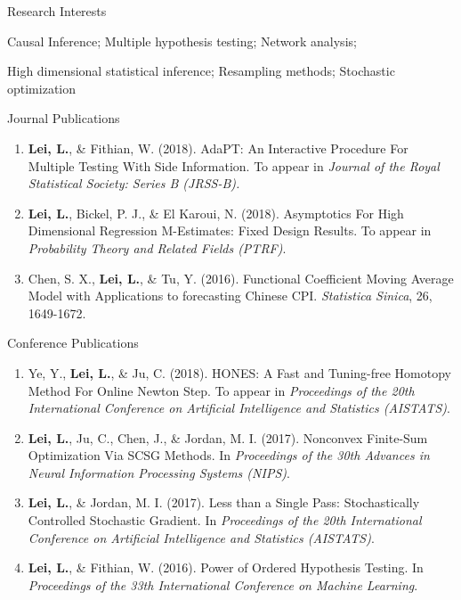 \documentclass{article}
\begin{document}
\begin{large}
\noindent Research Interests
\end{large}

\vspace{3mm}
Causal Inference; Multiple hypothesis testing; Network analysis; 

High dimensional statistical inference; Resampling methods; Stochastic optimization

\vspace{3mm}

\begin{large}
\noindent Journal Publications
\end{large}

\begin{enumerate}
\item \textbf{Lei, L.}, \& Fithian, W. (2018). AdaPT: An Interactive Procedure For Multiple Testing With Side Information. To appear in \emph{Journal of the Royal Statistical Society: Series B (JRSS-B).}
\item \textbf{Lei, L.}, Bickel, P. J., \& El Karoui, N. (2018). Asymptotics For High Dimensional Regression M-Estimates: Fixed Design Results. To appear in \emph{Probability Theory and Related Fields (PTRF)}.
\item Chen, S. X., \textbf{Lei, L.}, \& Tu, Y. (2016). Functional Coefficient Moving Average Model with Applications to forecasting Chinese CPI. \emph{Statistica Sinica}, 26, 1649-1672.
\end{enumerate}

\begin{large}
\noindent Conference Publications
\end{large}

\begin{enumerate}
\item Ye, Y., \textbf{Lei, L.}, \& Ju, C. (2018). HONES: A Fast and Tuning-free Homotopy Method For Online Newton Step. To appear in \emph{Proceedings of the 20th International Conference on Artificial Intelligence and Statistics (AISTATS)}.
\item \textbf{Lei, L.}, Ju, C., Chen, J., \& Jordan, M. I. (2017). Nonconvex Finite-Sum Optimization Via SCSG Methods. In \emph{Proceedings of the 30th Advances in Neural Information Processing Systems (NIPS)}.
\item \textbf{Lei, L.}, \& Jordan, M. I. (2017). Less than a Single Pass: Stochastically Controlled Stochastic Gradient. In \emph{Proceedings of the 20th International Conference on Artificial Intelligence and Statistics (AISTATS)}.
\item \textbf{Lei, L.}, \& Fithian, W. (2016). Power of Ordered Hypothesis Testing. In \emph{Proceedings of the 33th International
Conference on Machine Learning}.
\end{enumerate}
\end{document}
